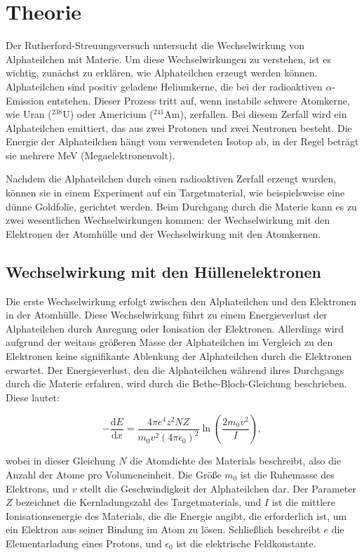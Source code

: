 \section[Theorie]{Theorie \textnormal{\cite{rutherford}}}

Der Rutherford-Streuungsversuch untersucht die Wechselwirkung von Alphateilchen mit Materie. Um diese Wechselwirkungen zu verstehen, ist es wichtig, zunächst zu erklären, wie Alphateilchen erzeugt werden können. Alphateilchen sind positiv geladene Heliumkerne, die bei der radioaktiven $\alpha$-Emission entstehen. Dieser Prozess tritt auf, wenn instabile schwere Atomkerne, wie Uran ($^{238}\mathrm{U}$) oder Americium ($^{241}\mathrm{Am}$), zerfallen. Bei diesem Zerfall wird ein Alphateilchen emittiert, das aus zwei Protonen und zwei Neutronen besteht. Die Energie der Alphateilchen hängt vom verwendeten Isotop ab, in der Regel beträgt sie mehrere MeV (Megaelektronenvolt).

Nachdem die Alphateilchen durch einen radioaktiven Zerfall erzeugt wurden, können sie in einem Experiment auf ein Targetmaterial, wie beispielsweise eine dünne Goldfolie, gerichtet werden. Beim Durchgang durch die Materie kann es zu zwei wesentlichen Wechselwirkungen kommen: der Wechselwirkung mit den Elektronen der Atomhülle und der Wechselwirkung mit den Atomkernen.

\subsection*{Wechselwirkung mit den Hüllenelektronen}
Die erste Wechselwirkung erfolgt zwischen den Alphateilchen und den Elektronen in der Atomhülle. Diese Wechselwirkung führt zu einem Energieverlust der Alphateilchen durch Anregung oder Ionisation der Elektronen. Allerdings wird aufgrund der weitaus größeren Masse der Alphateilchen im Vergleich zu den Elektronen keine signifikante Ablenkung der Alphateilchen durch die Elektronen erwartet. Der Energieverlust, den die Alphateilchen während ihres Durchgangs durch die Materie erfahren, wird durch die Bethe-Bloch-Gleichung beschrieben. Diese lautet:

\[
-\frac{\mathrm{d}E}{\mathrm{d}x} = \frac{4 \pi e^4 z^2 N Z}{m_0 v^2 (4 \pi \epsilon_0)^2} \ln \left(\frac{2 m_0 v^2}{I}\right),
\]

wobei in dieser Gleichung $N$ die Atomdichte des Materials beschreibt, also die Anzahl der Atome pro Volumeneinheit. Die Größe $m_0$ ist die Ruhemasse des Elektrons, und $v$ stellt die Geschwindigkeit der Alphateilchen dar. Der Parameter $Z$ bezeichnet die Kernladungszahl des Targetmaterials, und $I$ ist die mittlere Ionisationsenergie des Materials, die die Energie angibt, die erforderlich ist, um ein Elektron aus seiner Bindung im Atom zu lösen. Schließlich beschreibt $e$ die Elementarladung eines Protons, und $\epsilon_0$ ist die elektrische Feldkonstante.

